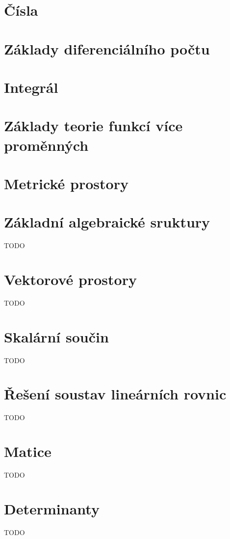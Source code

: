 


\section{Čísla}


\section{Základy diferenciálního počtu}


\section{Integrál}


\section{Základy teorie funkcí více proměnných}


\section{Metrické prostory}


\section{Základní algebraické sruktury}
TODO

\section{Vektorové prostory}
TODO

\section{Skalární součin}
TODO

\section{Řešení soustav lineárních rovnic}
TODO

\section{Matice}
TODO

\section{Determinanty}
TODO


